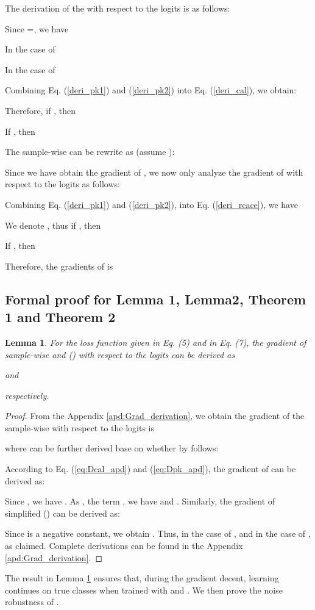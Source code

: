 \documentclass{article}
\newtheorem{lemma}{Lemma}
\begin{document}
The derivation of the  with respect to the logits is as follows:

Since =, we have 

In the case of 

In the case of 

Combining Eq. (\ref{deri_pk1}) and (\ref{deri_pk2}) into Eq. (\ref{deri_cal}), we obtain:

Therefore, if , then

If , then 

The sample-wise  can be rewrite as (assume ):

Since we have obtain the gradient of , we now only analyze the gradient of  with respect to the logits as follows:

Combining Eq. (\ref{deri_pk1}) and (\ref{deri_pk2}), into Eq. (\ref{deri_rcace}), we have 

We denote , thus if , then

If , then

Therefore, the gradients of  is


\subsection{Formal proof for Lemma 1, Lemma2, Theorem 1 and Theorem 2}
\label{apd:proof}
\begin{lemma}
	\label{lemma1}
	For the loss function  given in Eq. (5) and  in Eq. (7), the gradient of sample-wise  and  () with respect to the logits  can be derived as
	
	and
	
	respectively.
\end{lemma}
\begin{proof} From the Appendix \ref{apd:Grad_derivation}, we obtain the gradient of the sample-wise  with respect to the logits  is
	
	where  can be further derived base on whether  by follows:
	
	According to Eq. (\ref{eq:Dcal_apd}) and (\ref{eq:Dpk_apd}), the gradient of  can be derived as:
	
	Since , we have . As , the term , we have  and . Similarly, the gradient of simplified  () can be derived as:
	
	Since  is a negative constant, we obtain . Thus, in the case of ,  and in the case of ,  as claimed. Complete derivations can be found in the Appendix \ref{apd:Grad_derivation}.  
\end{proof}

The result in Lemma \ref{lemma1} ensures that, during the gradient decent, learning continues on true classes when trained with  and . We then prove the noise robustness of .
\end{document}
